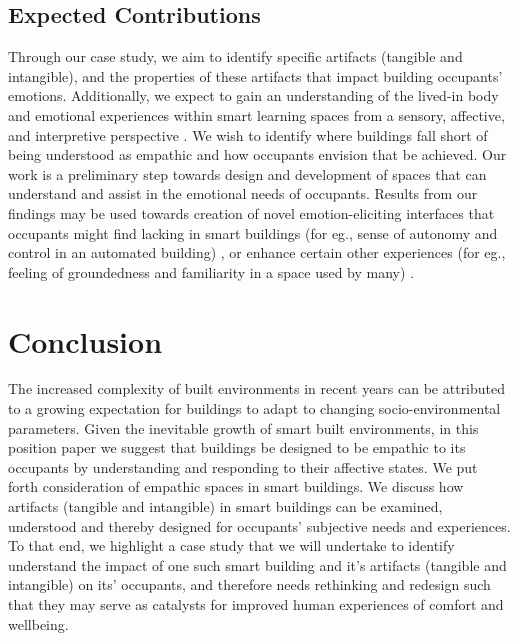 \documentclass[manuscript, anonymous, review]{acmart}
\begin{document}
\subsection{Expected Contributions}
Through our case study, we aim to identify specific artifacts (tangible and intangible), and the properties of these artifacts that impact building occupants' emotions. Additionally, we expect to gain an understanding of the lived-in body and emotional experiences within smart learning spaces from a sensory, affective, and interpretive perspective \cite{giaccardi2015foundations}. We wish to identify where buildings fall short of being understood as empathic and how occupants envision that be achieved. 
Our work is a preliminary step towards design and development of spaces that can understand and assist in the emotional needs of occupants. Results from our findings may be used towards creation of novel emotion-eliciting interfaces that occupants might find lacking in smart buildings (for eg., sense of autonomy and control in an automated building) \cite{moreno2014user}, or enhance certain other experiences (for eg., feeling of groundedness and familiarity in a space used by many) \cite{rehman2022personalisedcomfort}. 

\section{Conclusion}
The increased complexity of built environments in recent years can be attributed to a growing expectation for buildings to adapt to changing socio-environmental parameters. Given the inevitable growth of smart built environments, in this position paper we suggest that buildings be designed to be empathic to its occupants by understanding and responding to their affective states. We put forth consideration of empathic spaces in smart buildings. We discuss how artifacts (tangible and intangible) in smart buildings can be examined, understood and thereby designed for occupants' subjective needs and experiences. To that end, we highlight a case study that we will undertake to identify understand the impact of one such smart building and it's artifacts (tangible and intangible) on its'  occupants, and therefore needs rethinking and redesign such that they may serve as catalysts for improved human experiences of comfort and wellbeing. 




\end{document}
